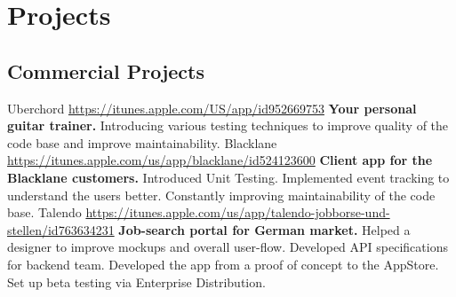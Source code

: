 \documentclass[11pt,a4paper]{moderncv}
\begin{document}
\maketitle

\section{Projects}
  \subsection{Commercial Projects}
  \cvline
    {Uberchord}
    {\url{https://itunes.apple.com/US/app/id952669753}\newline{}
    \textbf{Your personal guitar trainer.}\newline{}
    Introducing various testing techniques to improve quality of the code base and improve maintainability.}
  \cvline
    {Blacklane}
    {\url{https://itunes.apple.com/us/app/blacklane/id524123600}\newline{}
    \textbf{Client app for the Blacklane customers.}\newline{}
    Introduced Unit Testing.\newline{}
    Implemented event tracking to understand the users better.\newline{}
    Constantly improving maintainability of the code base.}
  \cvline
    {Talendo}
    {\url{https://itunes.apple.com/us/app/talendo-jobborse-und-stellen/id763634231}\newline{}
    \textbf{Job-search portal for German market.}\newline{}
    Helped a designer to improve mockups and overall user-flow.\newline{}
    Developed API specifications for backend team.\newline{}
    Developed the app from a proof of concept to the AppStore.\newline{}
    Set up beta testing via Enterprise Distribution.}
\end{document}
